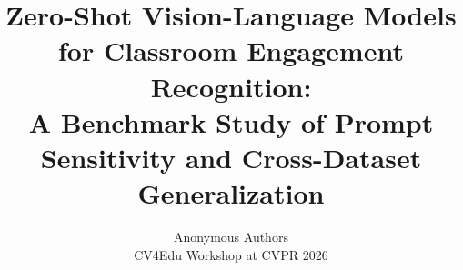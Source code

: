 \documentclass[10pt,twocolumn,letterpaper]{article}
\title{Zero-Shot Vision-Language Models for Classroom Engagement Recognition:\\
A Benchmark Study of Prompt Sensitivity and Cross-Dataset Generalization}
\author{Anonymous Authors\\
CV4Edu Workshop at CVPR 2026
}
\begin{document}
\maketitle








{
    \small
    
    
}
\end{document}
